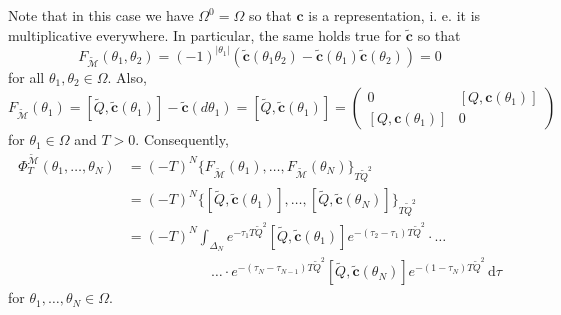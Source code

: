 \documentclass[a4paper, english, 12pt, bibliography=totocnumbered,
index=totoc]{scrartcl}
\begin{document}
Note that in this case we have $\Omega^0 = \Omega$ so
that $\mathbf{c}$ is a representation, i. e. it is multiplicative everywhere.
In particular, the same holds true for $\tilde{\mathbf{c}}$ so that
\begin{equation*}
	F_{\tilde{\mathscr{M}}}(\theta_1, \theta_2) = (-1)^{\lvert
		\theta_1 \rvert}(\tilde{\mathbf{c}}(\theta_1 \theta_2) -
	\tilde{\mathbf{c}}(\theta_1)\tilde{\mathbf{c}}(\theta_2)) = 0
\end{equation*}
for all $\theta_1, \theta_2 \in \Omega$.
Also,
\begin{equation*}
	F_{\tilde{\mathscr{M}}}(\theta_1) = [\tilde{Q},
	\tilde{\mathbf{c}}(\theta_1)] - \tilde{\mathbf{c}}(d \theta_1)
	= [\tilde{Q},
	\tilde{\mathbf{c}}(\theta_1)]
	=
	\begin{pmatrix}
		0 & [Q, \mathbf{c}(\theta_1)]\\
		[Q, \mathbf{c}(\theta_1)] & 0
	\end{pmatrix}
\end{equation*}
for $\theta_1 \in \Omega$ and $T > 0$.
Consequently,
\begin{align*}
	\Phi_T^{\tilde{\mathscr{M}}}(\theta_1, \ldots, \theta_N) & = (-T)^N
	\{F_{\tilde{\mathscr{M}}}(\theta_1), \ldots,
	F_{\tilde{\mathscr{M}}}(\theta_N)\}_{T\tilde{Q}^2} \\
	& = (-T)^N \{[\tilde{Q}, \tilde{\mathbf{c}}(\theta_1)], \ldots,
	[\tilde{Q}, \tilde{\mathbf{c}}(\theta_N)]\}_{T\tilde{Q}^2} \\
	& = (-T)^N \int_{\Delta_N}e^{-\tau_1 T\tilde{Q}^2}[\tilde{Q},
	\tilde{\mathbf{c}}(\theta_1)]e^{-(\tau_2 - \tau_1)T\tilde{Q}^2} \cdot
	\ldots \\
	& \qquad \qquad \qquad \ldots \cdot
	e^{-(\tau_{N} - \tau_{N-1})T\tilde{Q}^2}[\tilde{Q},
	\tilde{\mathbf{c}}(\theta_N)]e^{-(1 - \tau_N)T\tilde{Q}^2} \, \mathrm{d}
	\tau
\end{align*}
for $\theta_1, \ldots, \theta_N \in \Omega$.
\end{document}
